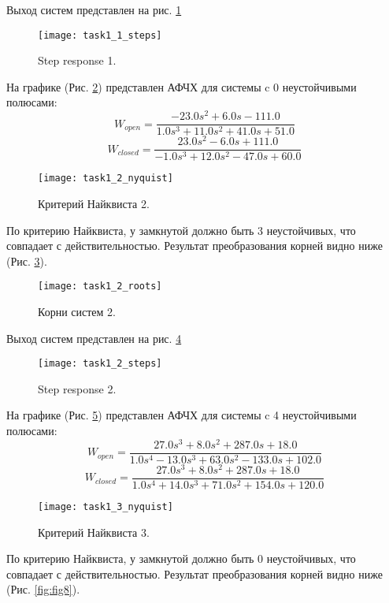 \documentclass[16pt]{article}
\begin{document}
Выход систем представлен на рис. \ref*{fig:fig3}

\begin{figure}[h!]
    \centering
    \texttt{[image: task1\_1\_steps]}
    \caption{Step response 1.}
    \label{fig:fig3}
\end{figure}

\newpage

На графике (Рис. \ref*{fig:fig4}) представлен АФЧХ для системы c 0 неустойчивыми полюсами:
\[
    W_{open} =\frac{- 23.0 s^{2} + 6.0 s - 111.0}{1.0 s^{3} + 11.0 s^{2} + 41.0 s + 51.0}
    \]
\[
    W_{closed} =\frac{23.0 s^{2} - 6.0 s + 111.0}{- 1.0 s^{3} + 12.0 s^{2} - 47.0 s + 60.0}
    \]
\begin{figure}[h!]
    \centering
    \texttt{[image: task1\_2\_nyquist]}
    \caption{Критерий Найквиста 2.}
    \label{fig:fig4}
\end{figure}

По критерию Найквиста, у замкнутой должно быть 3 неустойчивых, что совпадает с действительностью. Результат преобразования корней видно ниже (Рис. \ref*{fig:fig5}).

\begin{figure}[h!]
    \centering
    \texttt{[image: task1\_2\_roots]}
    \caption{Корни систем 2.}
    \label{fig:fig5}
\end{figure}

Выход систем представлен на рис. \ref*{fig:fig6}

\begin{figure}[h!]
    \centering
    \texttt{[image: task1\_2\_steps]}
    \caption{Step response 2.}
    \label{fig:fig6}
\end{figure}

\newpage

На графике (Рис. \ref*{fig:fig7}) представлен АФЧХ для системы c 4 неустойчивыми полюсами:
\[
    W_{open} =\frac{27.0 s^{3} + 8.0 s^{2} + 287.0 s + 18.0}{1.0 s^{4} - 13.0 s^{3} + 63.0 s^{2} - 133.0 s + 102.0}
    \]
\[
    W_{closed} =\frac{27.0 s^{3} + 8.0 s^{2} + 287.0 s + 18.0}{1.0 s^{4} + 14.0 s^{3} + 71.0 s^{2} + 154.0 s + 120.0}
    \]
\begin{figure}[h!]
    \centering
    \texttt{[image: task1\_3\_nyquist]}
    \caption{Критерий Найквиста 3.}
    \label{fig:fig7}
\end{figure}

По критерию Найквиста, у замкнутой должно быть 0 неустойчивых, что совпадает с действительностью. Результат преобразования корней видно ниже (Рис. \ref*{fig:fig8}).
\end{document}
